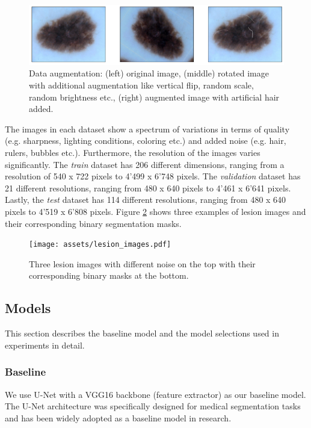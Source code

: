 \begin{figure}[ht]
  \centering
  \includegraphics[width=\columnwidth]{assets/data_augmentation.pdf}
  \caption[Datasets]
  {Data augmentation: (left) original image, (middle) rotated image with additional augmentation like vertical flip, random scale, random brightness etc., (right) augmented image with artificial hair added.}
  \label{data_augmentation}
\end{figure}

The images in each dataset show a spectrum of variations in terms of quality (e.g. sharpness, lighting conditions, coloring etc.) and added noise (e.g. hair, rulers, bubbles etc.). Furthermore, the resolution of the images varies significantly. The \emph{train} dataset has 206 different dimensions, ranging from a resolution of 540 x 722 pixels to 4'499 x 6'748 pixels. The \emph{validation} dataset has 21 different resolutions, ranging from 480 x 640 pixels to 4'461 x 6'641 pixels. Lastly, the \emph{test} dataset has 114 different resolutions, ranging from 480 x 640 pixels to 4'519 x 6'808 pixels. Figure \ref{lesion_images} shows three examples of lesion images and their corresponding binary segmentation masks.

\begin{figure}[ht]
  \centering
  \texttt{[image: assets/lesion\_images.pdf]}
  \caption[Lesion Images]
  {Three lesion images with different noise on the top with their corresponding binary masks at the bottom.}
  \label{lesion_images}
\end{figure}


\subsection{Models}
This section describes the baseline model and the model selections used in experiments in detail.

\subsubsection{Baseline}

We use U-Net \citep{unet-2015-ronneberger} with a VGG16 backbone (feature extractor) as our baseline model. The U-Net architecture was specifically designed for medical segmentation tasks and has been widely adopted as a baseline model in research.



